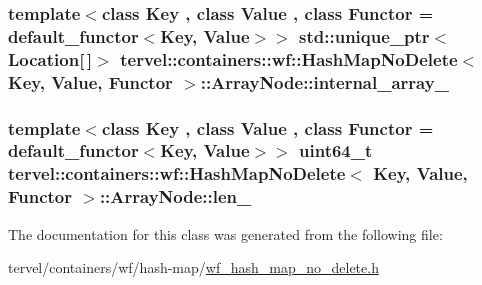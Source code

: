 \subsubsection[{internal\+\_\+array\+\_\+}]{\setlength{\rightskip}{0pt plus 5cm}template$<$class Key , class Value , class Functor  = default\+\_\+functor$<$\+Key, Value$>$$>$ std\+::unique\+\_\+ptr$<${\bf Location}\mbox{[}$\,$\mbox{]}$>$ {\bf tervel\+::containers\+::wf\+::\+Hash\+Map\+No\+Delete}$<$ Key, {\bf Value}, Functor $>$\+::Array\+Node\+::internal\+\_\+array\+\_\+\hspace{0.3cm}{\ttfamily [private]}}\label{classtervel_1_1containers_1_1wf_1_1_hash_map_no_delete_1_1_array_node_a7856c599048010921c610f1b6c5ef6e7}
\hypertarget{classtervel_1_1containers_1_1wf_1_1_hash_map_no_delete_1_1_array_node_a5f281eee813a9ccf8357399782bde1a3}{}
\subsubsection[{len\+\_\+}]{\setlength{\rightskip}{0pt plus 5cm}template$<$class Key , class Value , class Functor  = default\+\_\+functor$<$\+Key, Value$>$$>$ uint64\+\_\+t {\bf tervel\+::containers\+::wf\+::\+Hash\+Map\+No\+Delete}$<$ Key, {\bf Value}, Functor $>$\+::Array\+Node\+::len\+\_\+\hspace{0.3cm}{\ttfamily [private]}}\label{classtervel_1_1containers_1_1wf_1_1_hash_map_no_delete_1_1_array_node_a5f281eee813a9ccf8357399782bde1a3}


The documentation for this class was generated from the following file\+:\begin{DoxyCompactItemize}
\item 
tervel/containers/wf/hash-\/map/\hyperlink{wf__hash__map__no__delete_8h}{wf\+\_\+hash\+\_\+map\+\_\+no\+\_\+delete.\+h}\end{DoxyCompactItemize}
